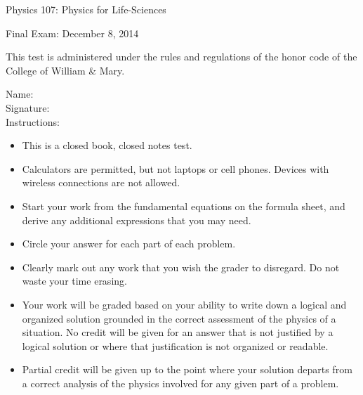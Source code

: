 \documentclass[letterpaper,addpoints,answers]{exam}
\begin{document}
\begin{coverpages}
 \large\bfseries
 
 \noindent 
 Physics 107: Physics for Life-Sciences

 \vspace{2ex}
 \noindent
 Final Exam: December 8, 2014

 \vspace{3ex}
 \noindent 
 This test is administered under the rules and regulations of the honor code of the College of William \& Mary.

 \vspace{2ex}
 \noindent 
 Name:\enspace\makebox[2.3in]{\hrulefill} \\

 \noindent 
 Signature:\enspace\makebox[2in]{\hrulefill} \\

 \vspace{5ex}
 \noindent 
 Instructions:
 \begin{itemize}
  \item This is a closed book, closed notes test.
  \item Calculators are permitted, but not laptops or cell phones. Devices with wireless connections are not allowed.
  \item Start your work from the fundamental equations on the formula sheet, and derive any additional expressions that you may need.
  \item Circle your answer for each part of each problem. 
  \item Clearly mark out any work that you wish the grader to disregard.  Do not waste your time erasing.
  \item Your work will be graded based on your ability to write down a logical and organized solution grounded in the correct assessment of the physics of a situation. No credit will be given for an answer that is not justified by a logical solution or where that justification is not organized or readable.
  \item Partial credit will be given up to the point where your solution departs from a correct analysis of the physics involved for any given part of a problem.
 \end{itemize}

 \pagebreak

 \begin{center}
  \gradetable[v][questions]
 \end{center}
 
\end{coverpages}
\end{document}
